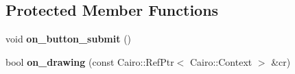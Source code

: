 \subsection*{Protected Member Functions}
\begin{DoxyCompactItemize}
\item 
void {\bfseries on\+\_\+button\+\_\+submit} ()\hypertarget{classInput3dWindow_a6620478dda7323a4e598dca1003ed3c9}{}\label{classInput3dWindow_a6620478dda7323a4e598dca1003ed3c9}

\item 
bool {\bfseries on\+\_\+drawing} (const Cairo\+::\+Ref\+Ptr$<$ Cairo\+::\+Context $>$ \&cr)\hypertarget{classInput3dWindow_abb61758284322bda2c9df6e343b396ae}{}\label{classInput3dWindow_abb61758284322bda2c9df6e343b396ae}

\end{DoxyCompactItemize}
